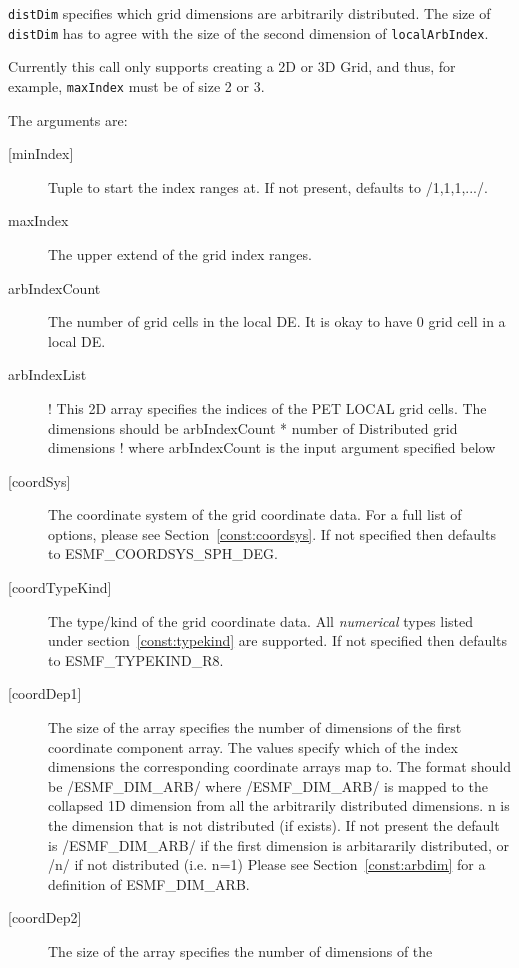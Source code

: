   {\tt distDim} specifies which grid dimensions are arbitrarily distributed. The
   size of {\tt distDim} has to agree with the size of the second dimension of
   {\tt localArbIndex}.
  
   Currently this call
   only supports creating a 2D or 3D Grid, and thus, for example, {\tt maxIndex} must be of size 2 or 3.
  
  
   The arguments are:
   \begin{description}
   \item[{[minIndex]}]
        Tuple to start the index ranges at. If not present, defaults
        to /1,1,1,.../.
   \item[maxIndex]
        The upper extend of the grid index ranges.
   \item[arbIndexCount]
        The number of grid cells in the local DE. It is okay to have 0
        grid cell in a local DE.
   \item[arbIndexList]
  !      This 2D array specifies the indices of the PET LOCAL grid cells.  The
        dimensions should be arbIndexCount * number of Distributed grid dimensions
  !      where arbIndexCount is the input argument specified below
   \item[{[coordSys]}]
       The coordinate system of the grid coordinate data.
       For a full list of options, please see Section~\ref{const:coordsys}.
       If not specified then defaults to ESMF\_COORDSYS\_SPH\_DEG.
   \item[{[coordTypeKind]}]
       The type/kind of the grid coordinate data. All {\em numerical} types
       listed under section~\ref{const:typekind} are supported.
       If not specified then defaults to ESMF\_TYPEKIND\_R8.
   \item[{[coordDep1]}]
       The size of the array specifies the number of dimensions of the
       first coordinate component array. The values specify which
       of the index dimensions the corresponding coordinate
       arrays map to. The format should be /ESMF\_DIM\_ARB/ where
       /ESMF\_DIM\_ARB/ is mapped to the collapsed 1D dimension from all
       the arbitrarily distributed dimensions.  n is the dimension that
       is not distributed (if exists).
       If not present the default is /ESMF\_DIM\_ARB/ if the first dimension
       is arbitararily distributed, or /n/ if not distributed (i.e. n=1)
        Please see Section~\ref{const:arbdim} for a definition of ESMF\_DIM\_ARB.
   \item[{[coordDep2]}]
       The size of the array specifies the number of dimensions of the

\end{description}
